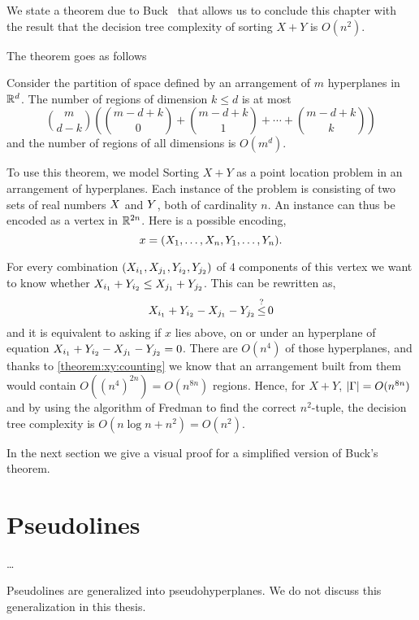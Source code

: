 We state a theorem due to Buck~\cite{Bu43} that allows us to conclude
this chapter with the result that the decision tree complexity of sorting
\(X + Y\) is \(O(n^2)\).

The theorem goes as follows
\begin{theorem}\label{theorem:xy:counting}
Consider the partition of space defined by an arrangement of $m$ hyperplanes in
$\mathbb{R}^d$.
The number of regions of dimension $k \le d$ is at most
\begin{displaymath}
	{m \choose d-k}
	\left(
		{m-d+k \choose 0}
		+
		{m-d+k \choose 1}
		+
		\cdots
		+
		{m-d+k \choose k}
	\right)
\end{displaymath}
and the number of regions of all dimensions is \(O(m^d)\).
\end{theorem}

To use this theorem, we model Sorting \(X + Y\) as a point location problem in an
arrangement of hyperplanes. Each instance of the problem is consisting of two
sets of real numbers $X$ and $Y$, both of cardinality $n$. An instance can
thus be encoded as a vertex in $\mathbb{R}^{2n}$. Here is a possible encoding,
\begin{displaymath}
x = (X_1, \ldots, X_n, Y_1, \ldots, Y_n).
\end{displaymath}

For every combination $(X_{i_1}, X_{j_1}, Y_{i_2}, Y_{j_2})$ of $4$
components of this vertex we want to know whether $X_{i_1} + Y_{i_2} \le
X_{j_1} + Y_{j_2}$. This can be rewritten as,
$$X_{i_1} + Y_{i_2} - X_{j_1} - Y_{j_2} \mathop{\le}^{?} 0$$
and it is equivalent to asking if $x$ lies above, on or under an
hyperplane of equation $X_{i_1} + Y_{i_2} - X_{j_1} - Y_{j_2} = 0$. There
are \(O(n^4)\) of those hyperplanes, and thanks to \ref{theorem:xy:counting}
we know that an arrangement built from them would contain
\(O({(n^4)}^{2n}) = O(n^{8n})\) regions. Hence, for \(X+Y\), \(|{\Gamma}| =
O(n^{8n})\) and by using the algorithm of Fredman to find the correct
$n^2$-tuple, the decision tree complexity is
\(O(n \log n + n^2) = O(n^2)\).

In the next section we give a visual proof for a simplified version of
Buck's theorem.



\section{Pseudolines}
\dots

Pseudolines are generalized into pseudohyperplanes. We do not discuss this
generalization in this thesis.


